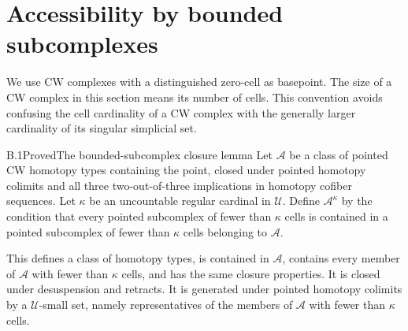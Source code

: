\section{Accessibility by bounded subcomplexes}

We use CW complexes with a distinguished zero-cell as basepoint. The size of a CW complex in this section means its number of cells. This convention avoids confusing the cell cardinality of a CW complex with the generally larger cardinality of its singular simplicial set.

\begin{claim}{B.1}{Proved}{The bounded-subcomplex closure lemma}\label{B1}
Let $\mathcal A$ be a class of pointed CW homotopy types containing the point, closed under pointed homotopy colimits and all three two-out-of-three implications in homotopy cofiber sequences. Let $\kappa$ be an uncountable regular cardinal in $\mathcal U$. Define $\mathcal A^\kappa$ by the condition that every pointed subcomplex of fewer than $\kappa$ cells is contained in a pointed subcomplex of fewer than $\kappa$ cells belonging to $\mathcal A$.

This defines a class of homotopy types, is contained in $\mathcal A$, contains every member of $\mathcal A$ with fewer than $\kappa$ cells, and has the same closure properties. It is closed under desuspension and retracts. It is generated under pointed homotopy colimits by a $\mathcal U$-small set, namely representatives of the members of $\mathcal A$ with fewer than $\kappa$ cells.
\end{claim}

